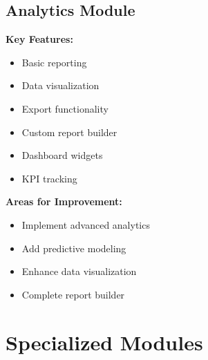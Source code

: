 \subsection{Analytics Module}
\begin{tcolorbox}[
    enhanced,
    title={Analytics Module: 50\% Complete},
    attach boxed title to top left,
    boxed title style={
        colback=danger!50,
        colframe=danger!50,
        arc=0mm,
    },
    colback=white,
    colframe=danger!50,
    arc=0mm,
    fonttitle=\bfseries
]
    \textbf{Key Features:}
    \begin{itemize}
        \item Basic reporting
        \item Data visualization
        \item Export functionality
        \item Custom report builder
        \item Dashboard widgets
        \item KPI tracking
    \end{itemize}
    
    \textbf{Areas for Improvement:}
    \begin{itemize}
        \item Implement advanced analytics
        \item Add predictive modeling
        \item Enhance data visualization
        \item Complete report builder
    \end{itemize}
\end{tcolorbox}

\clearpage
\section{Specialized Modules}

